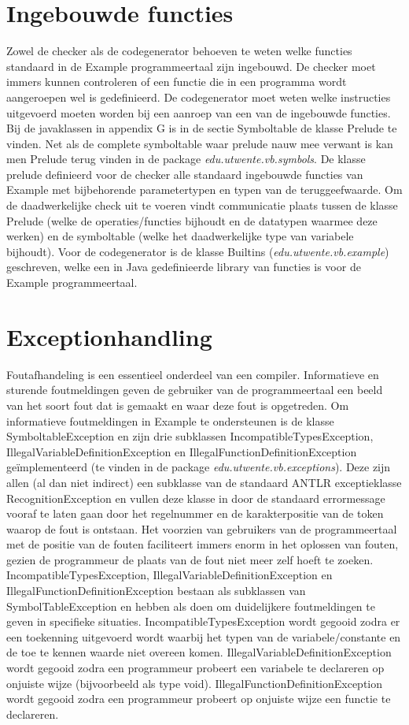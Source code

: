 \section{Ingebouwde functies}
Zowel de checker als de codegenerator behoeven te weten welke functies standaard in de Example programmeertaal zijn ingebouwd. De checker moet immers kunnen controleren of een functie die in een programma wordt aangeroepen wel is gedefinieerd. De codegenerator moet weten welke instructies uitgevoerd moeten worden bij een aanroep van een van de ingebouwde functies. Bij de javaklassen in appendix G is in de sectie Symboltable de klasse Prelude te vinden. Net als de complete symboltable waar prelude nauw mee verwant is kan men Prelude terug vinden in de package \emph{edu.utwente.vb.symbols}. De klasse prelude definieerd voor de checker alle standaard ingebouwde functies van Example met bijbehorende parametertypen en typen van de teruggeefwaarde. Om de daadwerkelijke check uit te voeren vindt communicatie plaats tussen de klasse Prelude (welke de operaties/functies bijhoudt en de datatypen waarmee deze werken) en de symboltable (welke het daadwerkelijke type van variabele bijhoudt). Voor de codegenerator is de klasse Builtins (\emph{edu.utwente.vb.example}) geschreven, welke een in Java gedefinieerde library van functies is voor de Example programmeertaal.

\section{Exceptionhandling}
Foutafhandeling is een essentieel onderdeel van een compiler. Informatieve en sturende foutmeldingen geven de gebruiker van de programmeertaal een beeld van het soort fout dat is gemaakt en waar deze fout is opgetreden. Om informatieve foutmeldingen in Example te ondersteunen is de klasse SymboltableException en zijn drie subklassen IncompatibleTypesException, IllegalVariableDefinitionException en IllegalFunctionDefinitionException ge\"{i}mplementeerd (te vinden in de package \emph{edu.utwente.vb.exceptions}). Deze zijn allen (al dan niet indirect) een subklasse van de standaard ANTLR exceptieklasse RecognitionException en vullen deze klasse in door de standaard errormessage vooraf te laten gaan door het regelnummer en de karakterpositie van de token waarop de fout is ontstaan. Het voorzien van gebruikers van de programmeertaal met de positie van de fouten faciliteert immers enorm in het oplossen van fouten, gezien de programmeur de plaats van de fout niet meer zelf hoeft te zoeken.
IncompatibleTypesException, IllegalVariableDefinitionException en IllegalFunctionDefinitionException bestaan als subklassen van SymbolTableException en hebben als doen om duidelijkere foutmeldingen te geven in specifieke situaties. IncompatibleTypesException wordt gegooid zodra er een toekenning uitgevoerd wordt waarbij het typen van de variabele/constante en de toe te kennen waarde niet overeen komen.
IllegalVariableDefinitionException wordt gegooid zodra een programmeur probeert een variabele te declareren op onjuiste wijze (bijvoorbeeld als type void). IllegalFunctionDefinitionException wordt gegooid zodra een programmeur probeert op onjuiste wijze een functie te declareren.

